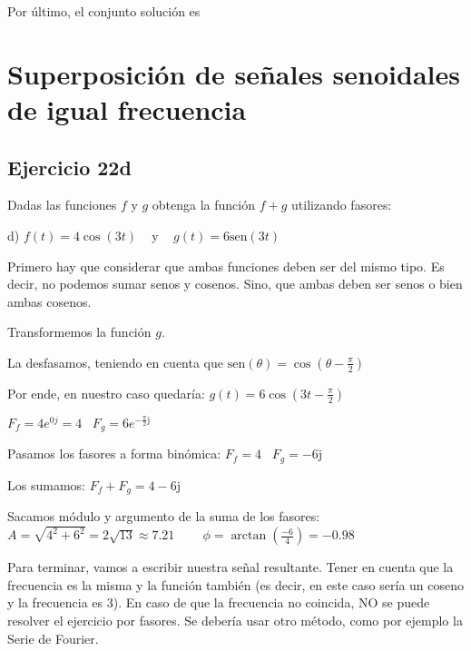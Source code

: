 \documentclass[11pt]{article}
\def\imj{\mathrm{j}}
\def\sen{\mathrm{sen}}
\begin{document}
	Por último, el conjunto solución es 
	\pagebreak
	\section{Superposición de señales senoidales de igual frecuencia}
	\subsection{Ejercicio 22d}
	Dadas las funciones $f$ y $g$ obtenga la función $f+g$ utilizando fasores:
	
	d) $f(t)=4\cos(3t) \;\;\;$ y $\;\;\;g(t)=6\sen(3t)$
	
	Primero hay que considerar que ambas funciones deben ser del mismo tipo. Es decir, no podemos sumar senos y cosenos. Sino, que ambas deben ser senos o bien ambas cosenos.
	
	Transformemos la función $g$.
	
	La desfasamos, teniendo en cuenta que $\sen(\theta)=\cos\left(\theta-\frac{\pi}{2}\right)$
	
	Por ende, en nuestro caso quedaría: $g(t)=6\cos\left(3t-\frac{\pi}{2}\right)$
	
	$F_{f}=4e^{0j}=4 \;\;\; F_{g}=6e^{-\frac{\pi}{2}\imj}$
	
	Pasamos los fasores a forma binómica:
	$F_{f}=4 \;\;\; F_{g}=-6\imj$
	
	Los sumamos:
	$F_{f}+F_{g}=4-6\imj$
	
	Sacamos módulo y argumento de la suma de los fasores:\\
	$\boxed{A=\sqrt{4^{2}+6^{2}}=2\sqrt{13}\approx7.21} \;\;\;\;\;\;\;\; \boxed{\phi=\arctan\left(\frac{-6}{4}\right)=-0.98}$
	
	Para terminar, vamos a escribir nuestra señal resultante. Tener en cuenta que la frecuencia es la misma y la función también (es decir, en este caso sería un coseno y la frecuencia es 3). En caso de que la frecuencia no coincida, NO se puede resolver el ejercicio por fasores. Se debería usar otro método, como por ejemplo la Serie de Fourier.
	
	
\end{document}
